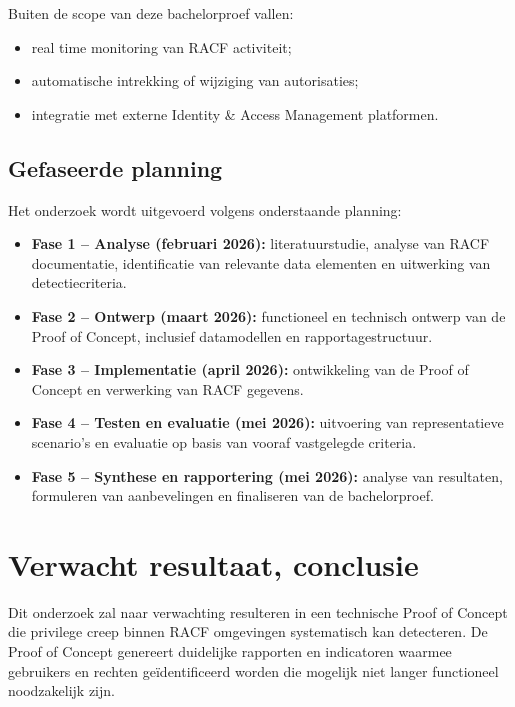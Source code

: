 Buiten de scope van deze bachelorproef vallen:
\begin{itemize}
	\item real time monitoring van RACF activiteit;
	\item automatische intrekking of wijziging van autorisaties;
	\item integratie met externe Identity \& Access Management platformen.
\end{itemize}

\subsection{Gefaseerde planning}

Het onderzoek wordt uitgevoerd volgens onderstaande planning:

\begin{itemize}
	\item \textbf{Fase 1 – Analyse (februari 2026):} literatuurstudie, analyse van RACF documentatie, identificatie van relevante data elementen en uitwerking van detectiecriteria.
	\item \textbf{Fase 2 – Ontwerp (maart 2026):} functioneel en technisch ontwerp van de Proof of Concept, inclusief datamodellen en rapportagestructuur.
	\item \textbf{Fase 3 – Implementatie (april 2026):} ontwikkeling van de Proof of Concept en verwerking van RACF gegevens.
	\item \textbf{Fase 4 – Testen en evaluatie (mei 2026):} uitvoering van representatieve scenario’s en evaluatie op basis van vooraf vastgelegde criteria.
	\item \textbf{Fase 5 – Synthese en rapportering (mei 2026):} analyse van resultaten, formuleren van aanbevelingen en finaliseren van de bachelorproef.
\end{itemize}


\section{Verwacht resultaat, conclusie}%
\label{sec:verwachte_resultaten}

Dit onderzoek zal naar verwachting resulteren in een technische Proof of Concept die privilege creep binnen RACF omgevingen systematisch kan detecteren. De Proof of Concept genereert duidelijke rapporten en indicatoren waarmee gebruikers en rechten geïdentificeerd worden die mogelijk niet langer functioneel noodzakelijk zijn.

